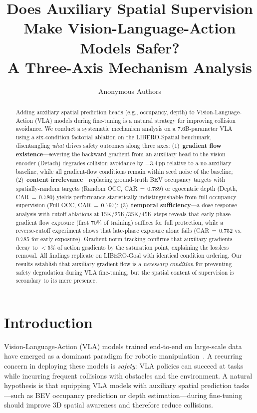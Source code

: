 \documentclass[10pt,twocolumn]{article}
\title{Does Auxiliary Spatial Supervision Make Vision-Language-Action Models Safer?\\A Three-Axis Mechanism Analysis}
\author{
Anonymous Authors
}
\date{}
\begin{document}
\maketitle

\begin{abstract}
Adding auxiliary spatial prediction heads (e.g., occupancy, depth) to Vision-Language-Action (VLA) models during fine-tuning is a natural strategy for improving collision avoidance.
We conduct a systematic mechanism analysis on a 7.6B-parameter VLA using a six-condition factorial ablation on the LIBERO-Spatial benchmark, disentangling \emph{what} drives safety outcomes along three axes:
(1)~\textbf{gradient flow existence}---severing the backward gradient from an auxiliary head to the vision encoder (Detach) degrades collision avoidance by $-3.4$\,pp relative to a no-auxiliary baseline, while all gradient-flow conditions remain within seed noise of the baseline;
(2)~\textbf{content irrelevance}---replacing ground-truth BEV occupancy targets with spatially-random targets (Random OCC, CAR\,$=$\,0.789) or egocentric depth (Depth, CAR\,$=$\,0.780) yields performance statistically indistinguishable from full occupancy supervision (Full OCC, CAR\,$=$\,0.797);
(3)~\textbf{temporal sufficiency}---a dose-response analysis with cutoff ablations at 15K/25K/35K/45K steps reveals that early-phase gradient flow exposure (first 70\% of training) suffices for full protection, while a reverse-cutoff experiment shows that late-phase exposure alone fails (CAR\,$=$\,0.752 vs.\,0.785 for early exposure).
Gradient norm tracking confirms that auxiliary gradients decay to $<$5\% of action gradients by the saturation point, explaining the lossless removal.
All findings replicate on LIBERO-Goal with identical condition ordering.
Our results establish that auxiliary gradient flow is a \emph{necessary condition} for preventing safety degradation during VLA fine-tuning, but the spatial content of supervision is secondary to its mere presence.
\end{abstract}

\section{Introduction}
\label{sec:intro}

Vision-Language-Action (VLA) models trained end-to-end on large-scale data have emerged as a dominant paradigm for robotic manipulation~\cite{brohan2023rt2,kim2024openvla}.
A recurring concern in deploying these models is \emph{safety}: VLA policies can succeed at tasks while incurring frequent collisions with obstacles and the environment.
A natural hypothesis is that equipping VLA models with auxiliary spatial prediction tasks---such as BEV occupancy prediction or depth estimation---during fine-tuning should improve 3D spatial awareness and therefore reduce collisions.
\end{document}
